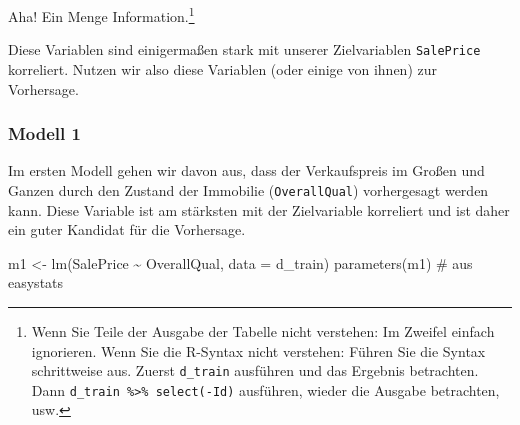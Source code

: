 \documentclass[
  a4paper,
]{scrbook}
\newenvironment{Shaded}{\begin{snugshade}}{\end{snugshade}}
\newcommand{\AttributeTok}[1]{\textcolor[rgb]{0.40,0.45,0.13}{#1}}
\newcommand{\CommentTok}[1]{\textcolor[rgb]{0.37,0.37,0.37}{#1}}
\newcommand{\FunctionTok}[1]{\textcolor[rgb]{0.28,0.35,0.67}{#1}}
\newcommand{\NormalTok}[1]{\textcolor[rgb]{0.00,0.23,0.31}{#1}}
\newcommand{\OtherTok}[1]{\textcolor[rgb]{0.00,0.23,0.31}{#1}}
\newcommand{\SpecialCharTok}[1]{\textcolor[rgb]{0.37,0.37,0.37}{#1}}
\theoremstyle{definition}
\theoremstyle{definition}
\theoremstyle{definition}
\theoremstyle{remark}
\begin{document}
Aha! Ein Menge Information.\footnote{Wenn Sie Teile der Ausgabe der
  Tabelle nicht verstehen: Im Zweifel einfach ignorieren. Wenn Sie die
  R-Syntax nicht verstehen: Führen Sie die Syntax schrittweise aus.
  Zuerst \texttt{d\_train} ausführen und das Ergebnis betrachten. Dann
  \texttt{d\_train\ \%\textgreater{}\%\ select(-Id)} ausführen, wieder
  die Ausgabe betrachten, usw.}

Diese Variablen sind einigermaßen stark mit unserer Zielvariablen
\texttt{SalePrice} korreliert. Nutzen wir also diese Variablen (oder
einige von ihnen) zur Vorhersage.

\subsubsection{Modell 1}\label{modell-1}

Im ersten Modell gehen wir davon aus, dass der Verkaufspreis im Großen
und Ganzen durch den Zustand der Immobilie (\texttt{OverallQual})
vorhergesagt werden kann. Diese Variable ist am stärksten mit der
Zielvariable korreliert und ist daher ein guter Kandidat für die
Vorhersage.

\begin{Shaded}
\begin{Highlighting}[]
\NormalTok{m1 }\OtherTok{\textless{}{-}} \FunctionTok{lm}\NormalTok{(SalePrice }\SpecialCharTok{\textasciitilde{}}\NormalTok{ OverallQual, }\AttributeTok{data =}\NormalTok{ d\_train)}
\FunctionTok{parameters}\NormalTok{(m1)  }\CommentTok{\# aus easystats}
\end{Highlighting}
\end{Shaded}
\end{document}
